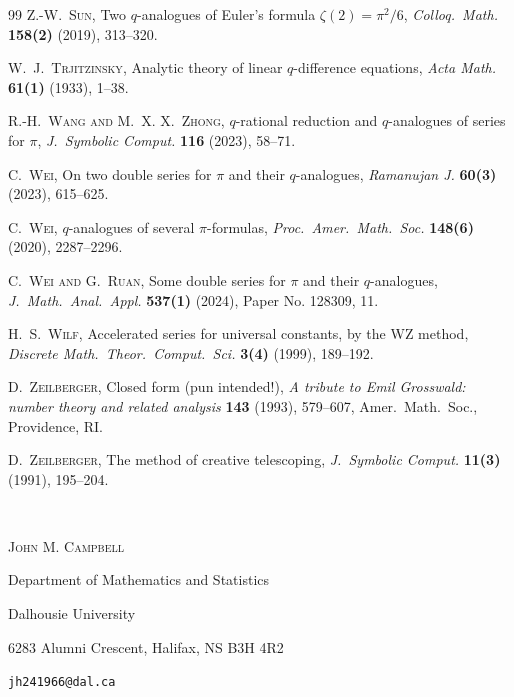 \documentclass[12pt]{article}
\begin{document}
\begin{thebibliography}{99}
 \textsc{Z.-W.\ Sun}, 
 Two {$q$}-analogues of {E}uler's formula {$\zeta(2)=\pi^2/6$}, 
 \emph{Colloq.\ Math.} {\bf 158(2)} (2019), 313--320. 

 \textsc{W.\ J.\ Trjitzinsky}, 
 Analytic theory of linear {$q$}-difference equations, 
 \emph{Acta Math.} {\bf 61(1)} (1933), 1--38. 

 \textsc{R.-H.\ Wang and M.\ X. X.\ Zhong}, 
 {$q$}-rational reduction and {$q$}-analogues of series for {$\pi$}, 
 \emph{J.\ Symbolic Comput.} {\bf 116} (2023), 58--71. 
 
 \textsc{C.\ Wei}, 
 On two double series for {$\pi$} and their {$q$}-analogues, 
 \emph{Ramanujan J.} {\bf 60(3)} (2023), 615--625. 

 \textsc{C.\ Wei}, 
 {$q$}-analogues of several {$\pi$}-formulas, 
 \emph{Proc.\ Amer.\ Math.\ Soc.} {\bf 148(6)} (2020), 2287--2296. 

 \textsc{C.\ Wei and G.\ Ruan}, 
 Some double series for {$\pi$} and their {$q$}-analogues, 
 \emph{J.\ Math.\ Anal.\ Appl.} {\bf 537(1)} (2024), Paper No. 128309, 11. 

 \textsc{H.\ S.\ Wilf}, 
 Accelerated series for universal constants, by the {WZ} method, 
 \emph{Discrete Math.\ Theor.\ Comput.\ Sci.} {\bf 3(4)} (1999), 189--192. 

 \textsc{D.\ Zeilberger}, 
 Closed form (pun intended!), 
 \emph{A tribute to {E}mil {G}rosswald: number theory and related analysis} {\bf 143} (1993), 579--607, 
 Amer.\ Math.\ Soc., Providence, RI. 

 \textsc{D.\ Zeilberger}, 
 The method of creative telescoping, 
 \emph{J.\ Symbolic Comput.} {\bf 11(3)} (1991), 195--204. 

\end{thebibliography}

 \ 

{\textsc{John M. Campbell}} 

\vspace{0.1in}

Department of Mathematics and Statistics

Dalhousie University 

6283 Alumni Crescent, Halifax, NS B3H 4R2

\vspace{0.1in}

{\tt jh241966@dal.ca}
\end{document}
